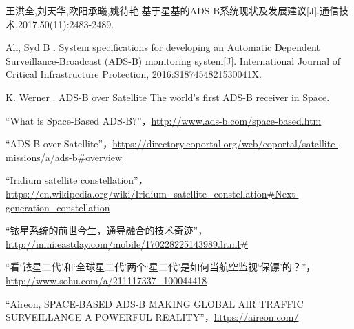 
\begin{thebibliography}{99}

王洪全,刘天华,欧阳承曦,姚待艳.基于星基的ADS-B系统现状及发展建议[J].通信技术,2017,50(11):2483-2489.




 Ali, Syd B . System specifications for developing an Automatic Dependent Surveillance-Broadcast (ADS-B) monitoring system[J]. International Journal of Critical Infrastructure Protection, 2016:S187454821530041X.

 K. Werner . ADS-B over Satellite The world’s first ADS-B receiver in Space.



“What is Space-Based ADS-B?”，\url{http://www.ads-b.com/space-based.htm}

“ADS-B over Satellite”，\url{https://directory.eoportal.org/web/eoportal/satellite-missions/a/ads-b#overview}

“Iridium satellite constellation”，\url{https://en.wikipedia.org/wiki/Iridium_satellite_constellation#Next-generation_constellation}

“铱星系统的前世今生，通导融合的技术奇迹”，\url{http://mini.eastday.com/mobile/170228225143989.html#}

“看‘铱星二代’和‘全球星二代’两个‘星二代’是如何当航空监视‘保镖’的？”，\url{http://www.sohu.com/a/211117337_100044418}

“Aireon, SPACE-BASED ADS-B MAKING GLOBAL AIR TRAFFIC SURVEILLANCE A POWERFUL REALITY”，\url{https://aireon.com/}

\end{thebibliography}